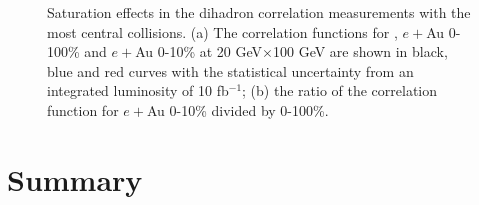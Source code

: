 \begin{figure}[hbt!]
\begin{center}
\quad
{}

\caption[Dihadron correlation function with centrality bin cut.]{Saturation effects in the dihadron correlation measurements with the most central collisions. (a) The correlation functions for \ep, $e+$Au 0-100\% and $e+$Au 0-10\% at 20 GeV$\times$100 GeV are shown in black, blue and red curves with the statistical uncertainty from an integrated luminosity of 10 fb$^{-1}$; (b) the ratio of the correlation function for $e+$Au 0-10\% divided by 0-100\%.}
\label{fig:dihadron_centrality}
\end{center}
\end{figure}





\section{Summary} \label{sec:summary}

